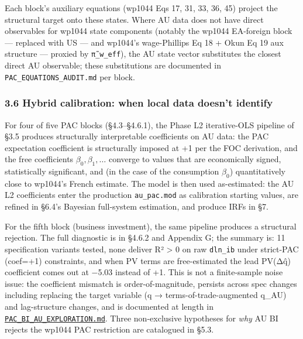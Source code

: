 \documentclass[
]{article}
\newcounter{none} %
\begin{document}
Each block's auxiliary equations (wp1044 Eqs 17, 31, 33, 36, 45) project
the structural target onto these states. Where AU data does not have
direct observables for wp1044 state components (notably the wp1044
EA-foreign block --- replaced with US --- and wp1044's wage-Phillips Eq
18 + Okun Eq 19 aux structure --- proxied by \texttt{π̃\_w\_eff}), the AU
state vector substitutes the closest direct AU observable; these
substitutions are documented in \texttt{PAC\_EQUATIONS\_AUDIT.md} per
block.

\subsubsection{3.6 Hybrid calibration: when local data doesn't
identify}\label{hybrid-calibration-when-local-data-doesnt-identify}

For four of five PAC blocks (§4.3--§4.6.1), the Phase L2 iterative-OLS
pipeline of §3.5 produces structurally interpretable coefficients on AU
data: the PAC expectation coefficient is structurally imposed at +1 per
the FOC derivation, and the free coefficients
\(\beta_0, \beta_1, \ldots\) converge to values that are economically
signed, statistically significant, and (in the case of the consumption
\(\beta_0\)) quantitatively close to wp1044's French estimate. The model
is then used as-estimated: the AU L2 coefficients enter the production
\texttt{au\_pac.mod} as calibration starting values, are refined in
§6.4's Bayesian full-system estimation, and produce IRFs in §7.

For the fifth block (business investment), the same pipeline produces a
structural rejection. The full diagnostic is in §4.6.2 and Appendix G;
the summary is: 11 specification variants tested, none deliver R²
\textgreater{} 0 on raw \texttt{dln\_ib} under strict-PAC (coef=+1)
constraints, and when PV terms are free-estimated the lead PV(Δq̂)
coefficient comes out at −5.03 instead of +1. This is not a
finite-sample noise issue: the coefficient mismatch is
order-of-magnitude, persists across spec changes including replacing the
target variable (q → terms-of-trade-augmented q\_AU) and lag-structure
changes, and is documented at length in
\href{../PAC_BI_AU_EXPLORATION.md}{\texttt{PAC\_BI\_AU\_EXPLORATION.md}}.
Three non-exclusive hypotheses for \emph{why} AU BI rejects the wp1044
PAC restriction are catalogued in §5.3.
\end{document}
